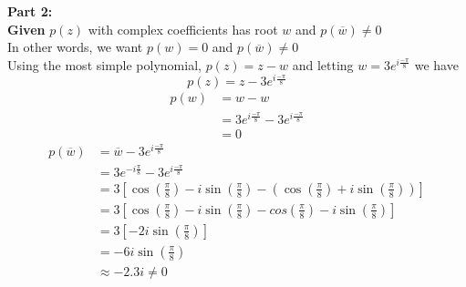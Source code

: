 \documentclass[a4paper, 8pt]{extarticle}
\begin{document}
\begin{examplebox}[: Determine all solutions to $z^4 = -81i$ and find a polynomial $p(z)$ with complex coefficients with root $w$ and $p(\overline{w}) \neq 0$]
    \textbf{Part 2:} \\
    \textbf{Given} $p(z)$ with complex coefficients has root $w$ and $p(\overline{w}) \neq 0$ \\
    In other words, we want $p(w) = 0$ and $p(\overline{w}) \neq 0$ \\
    Using the most simple polynomial, $p(z) = z - w$ and letting $w = 3e^{i\frac{-\pi}{8}}$ we have
    $$p(z) = z - 3e^{i\frac{-\pi}{8}}$$
    \begin{align*}
        p(w) & = w - w                                       \\
             & = 3e^{i\frac{-\pi}{8}} - 3e^{i\frac{-\pi}{8}} \\
             & = 0
    \end{align*}
    \begin{align*}
        p(\overline{w}) & = \overline{w} - 3e^{i\frac{-\pi}{8}}                                                                                                                            \\
                        & = 3e^{-i\frac{\pi}{8}} - 3e^{i\frac{-\pi}{8}}                                                                                                                    \\
                        & = 3\left[\cos\left(\frac{\pi}{8}\right) - i\sin\left(\frac{\pi}{8}\right) - \left(\cos\left(\frac{\pi}{8}\right) + i\sin\left(\frac{\pi}{8}\right)\right)\right] \\
                        & = 3\left[\cos\left(\frac{\pi}{8}\right) - i\sin\left(\frac{\pi}{8}\right) - cos\left(\frac{\pi}{8}\right) - i\sin\left(\frac{\pi}{8}\right)\right]               \\
                        & = 3\left[-2i\sin\left(\frac{\pi}{8}\right)\right]                                                                                                                \\
                        & = -6i\sin\left(\frac{\pi}{8}\right)                                                                                                                              \\
                        & \approx -2.3i \neq 0
    \end{align*}
\end{examplebox}
\end{document}
